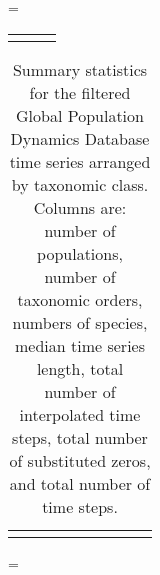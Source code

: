 \LTcapwidth=\textwidth
\begin{footnotesize}
\begin{longtable}{>{\RaggedRight}m{3.2cm}>{\RaggedRight}p{6.5cm}>{\RaggedRight}p{5.0cm}}
\toprule

\label{tab:phylopic}
\end{longtable}
\end{footnotesize}






\clearpage

\begin{table}
\begin{footnotesize}

\caption[Summary statistics for the filtered Global Population Dynamics
  Database time series arranged by taxonomic class.]{Summary statistics for the filtered Global Population Dynamics
  Database time series arranged by taxonomic class. Columns are: number of
  populations, number of taxonomic orders, numbers of species, median time
  series length, total number of interpolated time steps, total number of
  substituted zeros, and total number of time steps.}

\smallskip
\begin{tabular}{lrrrrrrrr}
\toprule

\label{tab:stats}
\end{tabular}
\end{footnotesize}
\end{table}

\clearpage

\LTcapwidth=\textwidth
{}

